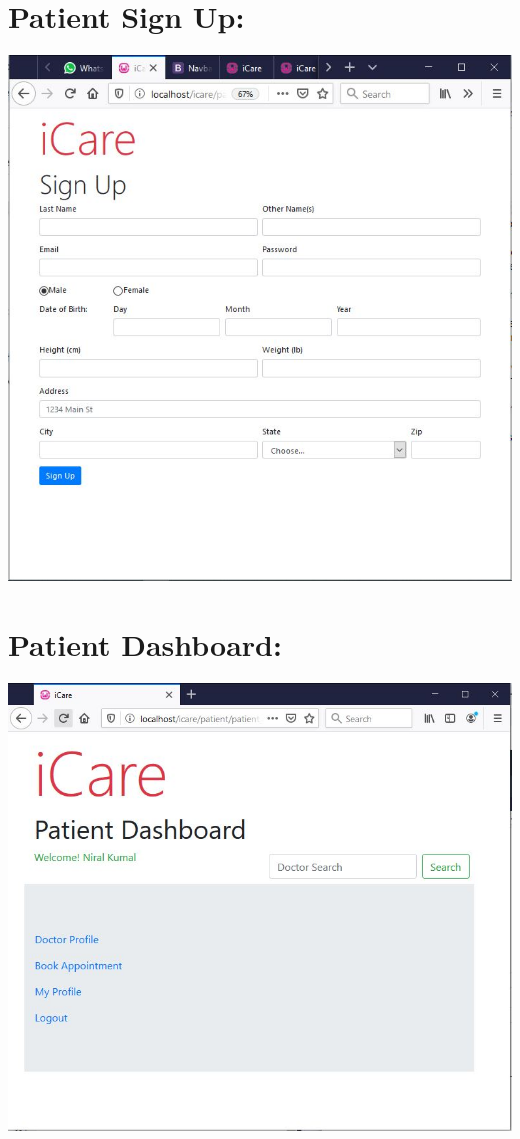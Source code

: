 \documentclass[a4paper,12pt]{report}
\begin{document}
\section*{Patient Sign Up:}
\includegraphics[scale=0.8]{Implementation/patientSignUp.JPG}

\section*{Patient Dashboard:}
\includegraphics[scale=0.8]{Implementation/patientDashboard.JPG}
\end{document}
